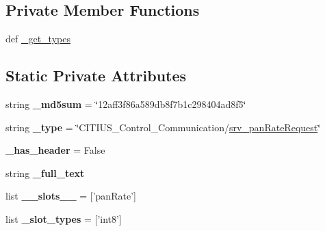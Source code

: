 \subsection*{\-Private \-Member \-Functions}
\begin{DoxyCompactItemize}
\item 
def \hyperlink{class_c_i_t_i_u_s___control___communication_1_1srv_1_1__srv__pan_rate_1_1srv__pan_rate_request_a6da7772a4fb3c383148fbcc8d0658f9f}{\-\_\-get\-\_\-types}
\end{DoxyCompactItemize}
\subsection*{\-Static \-Private \-Attributes}
\begin{DoxyCompactItemize}
\item 
\hypertarget{class_c_i_t_i_u_s___control___communication_1_1srv_1_1__srv__pan_rate_1_1srv__pan_rate_request_ac76205fe3209e845fe2107ea697d9924}{string {\bfseries \-\_\-md5sum} = \char`\"{}12aff3f86a589db8f7b1c298404ad8f5\char`\"{}}\label{class_c_i_t_i_u_s___control___communication_1_1srv_1_1__srv__pan_rate_1_1srv__pan_rate_request_ac76205fe3209e845fe2107ea697d9924}

\item 
\hypertarget{class_c_i_t_i_u_s___control___communication_1_1srv_1_1__srv__pan_rate_1_1srv__pan_rate_request_aff1c3f3e13e3e1e8631fd70f08cfa594}{string {\bfseries \-\_\-type} = \char`\"{}\-C\-I\-T\-I\-U\-S\-\_\-\-Control\-\_\-\-Communication/\hyperlink{class_c_i_t_i_u_s___control___communication_1_1srv_1_1__srv__pan_rate_1_1srv__pan_rate_request}{srv\-\_\-pan\-Rate\-Request}\char`\"{}}\label{class_c_i_t_i_u_s___control___communication_1_1srv_1_1__srv__pan_rate_1_1srv__pan_rate_request_aff1c3f3e13e3e1e8631fd70f08cfa594}

\item 
\hypertarget{class_c_i_t_i_u_s___control___communication_1_1srv_1_1__srv__pan_rate_1_1srv__pan_rate_request_acbf7a02c59ad6c8c7a0ab176cee13249}{{\bfseries \-\_\-has\-\_\-header} = \-False}\label{class_c_i_t_i_u_s___control___communication_1_1srv_1_1__srv__pan_rate_1_1srv__pan_rate_request_acbf7a02c59ad6c8c7a0ab176cee13249}

\item 
string {\bfseries \-\_\-full\-\_\-text}
\item 
\hypertarget{class_c_i_t_i_u_s___control___communication_1_1srv_1_1__srv__pan_rate_1_1srv__pan_rate_request_a95554a6017a1ef4f507fd09ffc7114cf}{list {\bfseries \-\_\-\-\_\-slots\-\_\-\-\_\-} = \mbox{[}'pan\-Rate'\mbox{]}}\label{class_c_i_t_i_u_s___control___communication_1_1srv_1_1__srv__pan_rate_1_1srv__pan_rate_request_a95554a6017a1ef4f507fd09ffc7114cf}

\item 
\hypertarget{class_c_i_t_i_u_s___control___communication_1_1srv_1_1__srv__pan_rate_1_1srv__pan_rate_request_a3cbeff23d5d7fc752cb5682f6bfbaffb}{list {\bfseries \-\_\-slot\-\_\-types} = \mbox{[}'int8'\mbox{]}}\label{class_c_i_t_i_u_s___control___communication_1_1srv_1_1__srv__pan_rate_1_1srv__pan_rate_request_a3cbeff23d5d7fc752cb5682f6bfbaffb}

\end{DoxyCompactItemize}



